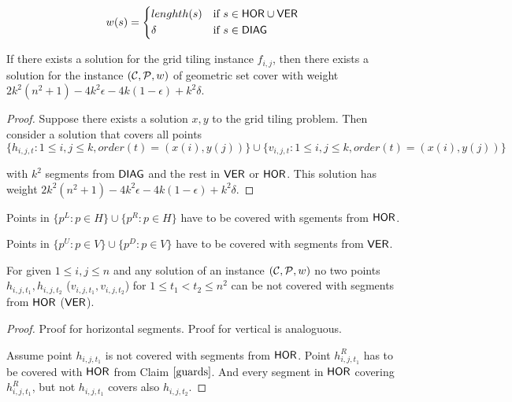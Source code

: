 \begin{equation}
w(s) =
	\begin{cases*}
	  lenghth(s) 			& if $s \in \allhor \cup \allver$ \\
	  \delta        & if $s \in \alldiag$
	\end{cases*}
\end{equation}

\newcommand{\solWeight}{2k^2(n^2+1) - 4k^2\epsilon -4k(1-\epsilon) +k^2\delta }

\begin{lemma}
\label{set_cover_solution_exists}
	If there exists a solution for the grid tiling instance $f_{i,j}$,
	then there exists a solution for the instance $(\mathcal{C}, \mathcal{P}, w)$
	of geometric set cover
	with weight $\solWeight$.
\end{lemma}

\begin{proof}
	Suppose there exists a solution $x,y$ to the grid tiling problem.
	Then consider a solution that covers
	all points
	$$\{h_{i, j, t} : 1 \le i, j \le k, order(t)=(x(i), y(j))\}
	\cup \{v_{i, j, t} : 1 \le i, j \le k, order(t)=(x(i), y(j))\}$$
	
	with $k^2$ segments from $\mathsf{DIAG}$
	and the rest in $\mathsf{VER}$ or $\mathsf{HOR}$.
	This solution has weight $\solWeight$.
\end{proof}


\begin{claim}
\label{guards}
Points in $\{p^L : p \in H\} \cup \{p^R : p \in H\}$
have to be covered with sgements from $\mathsf{HOR}$.

Points in $\{p^U : p \in V\} \cup \{p^D : p \in V\} $
have to be covered with segments from $\mathsf{VER}$.
\end{claim}


\begin{claim}
\label{one_diag_in_square}
For given $1 \le i, j \le n$
and any solution of an instance $(\mathcal{C}, \mathcal{P}, w)$
no two points $h_{i, j, t_1}, h_{i, j, t_2}$
($v_{i, j, t_1}, v_{i, j, t_2}$)
for $1 \le t_1 < t_2 \le n^2$
can be not covered with segments from $\mathsf{HOR}$ ($\mathsf{VER}$).
\end{claim}

\begin{proof}
Proof for horizontal segments. Proof for vertical is analoguous.

Assume point $h_{i, j, t_1}$ is not covered with
segments from $\mathsf{HOR}$.
Point $h^R_{i, j, t_1}$ has to be covered with $\mathsf{HOR}$
from Claim $\ref{guards}$.
And every segment in $\mathsf{HOR}$ covering $h^R_{i, j, t_1}$,
but not $h_{i,j,t_1}$ covers also $h_{i, j, t_2}$.
\end{proof}

